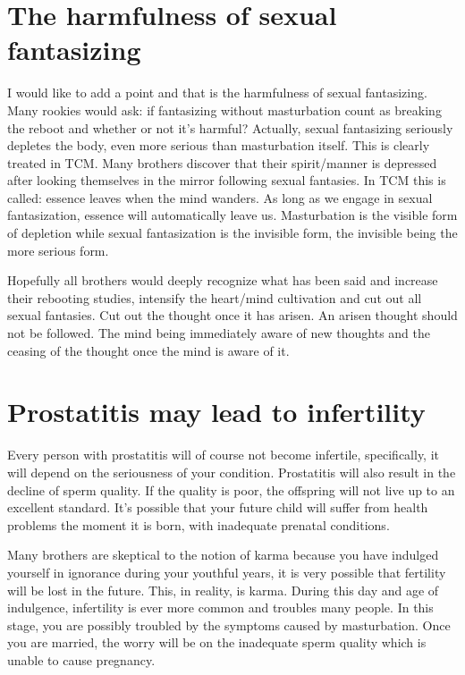 \documentclass[
]{book}
\begin{document}
\hypertarget{the-harmfulness-of-sexual-fantasizing}{%
\section{The harmfulness of sexual fantasizing}\label{the-harmfulness-of-sexual-fantasizing}}

I would like to add a point and that is the harmfulness of sexual fantasizing. Many rookies would ask: if fantasizing without masturbation count as breaking the reboot and whether or not it's harmful? Actually, sexual fantasizing seriously depletes the body, even more serious than masturbation itself. This is clearly treated in TCM. Many brothers discover that their spirit/manner is depressed after looking themselves in the mirror following sexual fantasies. In TCM this is called: essence leaves when the mind wanders. As long as we engage in sexual fantasization, essence will automatically leave us. Masturbation is the visible form of depletion while sexual fantasization is the invisible form, the invisible being the more serious form.

Hopefully all brothers would deeply recognize what has been said and increase their rebooting studies, intensify the heart/mind cultivation and cut out all sexual fantasies. Cut out the thought once it has arisen. An arisen thought should not be followed. The mind being immediately aware of new thoughts and the ceasing of the thought once the mind is aware of it.

\hypertarget{prostatitis-may-lead-to-infertility}{%
\section{Prostatitis may lead to infertility}\label{prostatitis-may-lead-to-infertility}}

Every person with prostatitis will of course not become infertile, specifically, it will depend on the seriousness of your condition. Prostatitis will also result in the decline of sperm quality. If the quality is poor, the offspring will not live up to an excellent standard. It's possible that your future child will suffer from health problems the moment it is born, with inadequate prenatal conditions.

Many brothers are skeptical to the notion of karma because you have indulged yourself in ignorance during your youthful years, it is very possible that fertility will be lost in the future. This, in reality, is karma. During this day and age of indulgence, infertility is ever more common and troubles many people. In this stage, you are possibly troubled by the symptoms caused by masturbation. Once you are married, the worry will be on the inadequate sperm quality which is unable to cause pregnancy.
\end{document}
